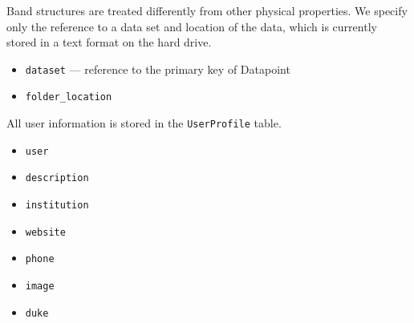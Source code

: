 \documentclass{article}
\begin{document}
Band structures are treated differently from other physical properties. We specify only the reference to a data set and location of the data, which is currently stored in a text format on the hard drive.
\begin{tcolorbox}[colback=green!5,colframe=green!40!black,title=BandStructure(Base)]
  \begin{itemize}
  \item \texttt{dataset} --- reference to the primary key of Datapoint
  \item \texttt{folder\_location}
  \end{itemize}
\end{tcolorbox}

All user information is stored in the \texttt{UserProfile} table.
\begin{tcolorbox}[colback=green!5,colframe=green!40!black,title=UserProfile]
  \begin{itemize}
  \item \texttt{user}
  \item \texttt{description}
  \item \texttt{institution}
  \item \texttt{website}
  \item \texttt{phone}
  \item \texttt{image}
  \item \texttt{duke}
  \end{itemize}
\end{tcolorbox}
\end{document}
